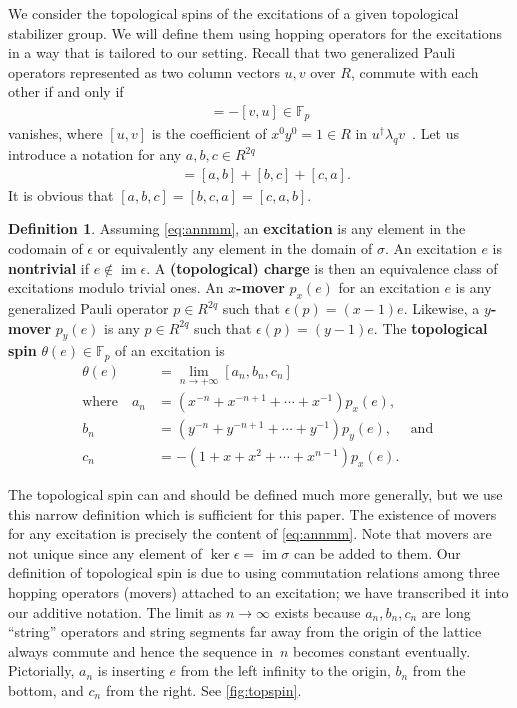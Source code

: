 \documentclass[aps,pra,
floatfix,notitlepage,
nofootinbib,
longbibliography,11pt]{revtex4-1}
\theoremstyle{definition}
\newtheorem{definition}[lemma]{Definition}
\newcommand{\FF}{{\mathbb{F}}}
\DeclareMathOperator{\im}{\mathrm{im}}
\begin{document}
We consider the topological spins of the excitations of a given topological stabilizer group.
We will define them using hopping operators for the excitations 
in a way that is tailored to our setting.
Recall that two generalized Pauli operators represented as two column vectors $u,v$ over $R$,
commute with each other if and only if
\begin{align}
[u,v] = - [v,u] \in \FF_p
\end{align}
vanishes,
where $[u,v]$ is
the coefficient of $x^0 y^0 = 1 \in R$ in $u^\dagger \lambda_q v$~\cite[Prop.1.2]{Haah2013}.
Let us introduce a notation for any  $a,b,c \in R^{2q}$
\begin{align}
[a,b,c] &= [a, b] + [b, c] + [c, a] .
\end{align}
It is obvious that $[a,b,c] = [b,c,a] = [c,a,b]$.

\begin{definition}\label{def:tspin}
Assuming \cref{eq:annmm},
an {\bf excitation} is any element in the codomain of $\epsilon$
or equivalently any element in the domain of $\sigma$.
An excitation $e$ is {\bf nontrivial} if $e \notin \im \epsilon$.
A {\bf (topological) charge} is then an equivalence class of excitations modulo trivial ones.
An {\bf $x$-mover} $p_x(e)$ for an excitation $e$
is any generalized Pauli operator $p \in R^{2q}$ such that $\epsilon( p ) = (x-1)e$.
Likewise, a {\bf $y$-mover} $p_y(e)$ is any $p \in R^{2q}$ such that $\epsilon (p) = (y-1)e$.
The {\bf topological spin} $\theta(e) \in \FF_p$ of an excitation is
\begin{align}
\theta(e) &= \lim_{n \to +\infty} [a_n,b_n,c_n] \label{eq:theta}\\
\text{where} \quad
a_n &= (x^{-n} + x^{-n+1} + \cdots + x^{-1})p_x(e), \nonumber\\
b_n &= (y^{-n} + y^{-n+1} + \cdots + y^{-1})p_y(e), \quad \text{ and } \nonumber\\
c_n &= -(1 + x + x^2 + \cdots + x^{n-1}) p_x(e). \nonumber
\end{align}
\end{definition}

The topological spin can and should be defined much more generally,
but we use this narrow definition which is sufficient for this paper.
The existence of movers for any excitation is precisely the content of \cref{eq:annmm}.
Note that movers are not unique 
since any element of $\ker \epsilon = \im \sigma$ can be added to them.
Our definition of topological spin is due to \cite{LevinWen2003Fermions}
using commutation relations among three hopping operators (movers)
attached to an excitation; we have transcribed it into our additive notation.
The limit as $n \to \infty$ exists because $a_n,b_n,c_n$ are 
long ``string'' operators and string segments far away 
from the origin of the lattice always commute
and hence the sequence in~$n$ becomes constant eventually.
Pictorially, $a_n$ is inserting $e$ from the left infinity to the origin,
$b_n$ from the bottom, and $c_n$ from the right.
See \cref{fig:topspin}.
\end{document}
